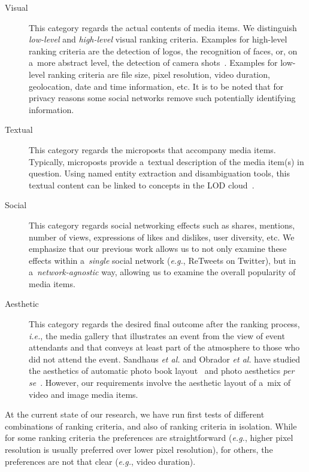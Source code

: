 \documentclass[runningheads,a4paper,11pt]{llncs}
\begin{document}
\begin{description}
\item[Visual]
This category regards the actual contents of media items.
We distinguish \emph{low-level} and \emph{high-level} visual ranking criteria.
Examples for high-level ranking criteria are the detection of logos,
the recognition of faces, or, on a~more abstract level,
the detection of camera shots~\cite{Crowdsourcing2011}.
Examples for low-level ranking criteria are file size, pixel resolution,
video duration, geolocation, date and time information, etc.
It is to be noted that for privacy reasons some social networks
remove such potentially identifying information.

\item[Textual]
This category regards the microposts that accompany media items.
Typically, microposts provide a~textual description of the media item(s) in question.
Using named entity extraction and disambiguation tools,
this textual content can be linked to concepts in the LOD cloud~\cite{Facebook2011}.

\item[Social]
This category regards social networking effects such as shares, mentions,
number of views, expressions of likes and dislikes, user diversity, etc.
We emphasize that our previous work allows us
to not only examine these effects within a~\emph{single} social network (\emph{e.g.}, ReTweets on Twitter),
but in a~\emph{network-agnostic} way, allowing us
to examine the overall popularity of media items.

\item[Aesthetic]
This category regards the desired final outcome after the ranking process, \emph{i.e.},
the media gallery that illustrates an event from the view of event attendants and
that conveys at least part of the atmosphere to those who did not attend the event.
Sandhaus \emph{et al.} and Obrador \emph{et al.} have studied the aesthetics of
automatic photo book layout~\cite{Photo2011}
and photo aesthetics \emph{per se}~\cite{Photo2012}.
However, our requirements involve the aesthetic layout of a~mix of video and image media items.
\end{description}

\noindent At the current state of our research, we have run first tests of different combinations
of ranking criteria, and also of ranking criteria in isolation.
While for some ranking criteria the preferences are straightforward
(\emph{e.g.}, higher pixel resolution is usually preferred over lower pixel resolution),
for others, the preferences are not that clear (\emph{e.g.}, video duration).
\end{document}
